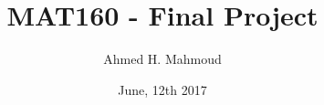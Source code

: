 \documentclass[12pt]{article}
\begin{document}
\title{MAT160 - Final Project}
\author{Ahmed H. Mahmoud}
\date{June, 12th 2017} 

\maketitle

\newcommand{\cn}{Crank-Nicolson}







\newpage



\newpage






\end{document}
